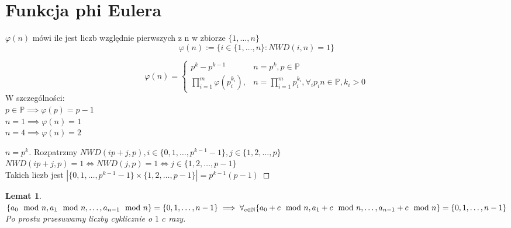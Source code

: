 \documentclass{article}
\theoremstyle{break}
\newtheorem{lemma}{Lemat}
\newtheorem{proof}{Dowód}
\begin{document}
\section{Funkcja phi Eulera}
$\varphi(n)$ mówi ile jest liczb względnie pierwszych z n w zbiorze $\{1, \dots, n\}$
\begin{displaymath}
	\varphi(n) := \{ i \in \{1, \dots, n \} : NWD(i, n) = 1 \}
\end{displaymath}

\begin{displaymath}
    \varphi(n) = \begin{cases}
        p^{k} - p^{k-1} & n = p^k, p \in \mathbb{P}\\
        \prod_{i = 1}^{m} \varphi(p_i^{k_i}), & n = \prod_{i=1}^m p_i^{k_i}, \forall_i p_i n\in \mathbb{P}, k_i > 0
        \end{cases}
\end{displaymath}
W szczególności: \\
$p \in \mathbb{P} \implies \varphi(p) = p-1$ \\
$n = 1 \implies \varphi(n) = 1$\\
$n = 4 \implies \varphi(n) = 2$

\begin{proof}[$ n = p^k$]
Rozpatrzmy $NWD(ip + j, p), i \in \{0, 1, \dots, p^{k-1} - 1\}, j \in \{1, 2, \dots, p \}$ \\
$NWD(ip + j, p) = 1 \iff NWD(j, p) = 1 \iff j \in \{1, 2, \dots, p - 1\}$ \\
Takich liczb jest $|\{0, 1, \dots, p^{k-1} - 1\}\times\{1, 2, \dots, p-1\}| = p^{k-1}(p-1)$

\end{proof}

\begin{lemma}
$\{ a_0 \mod{n}, a_1 \mod{n}, \dots, a_{n-1} \mod{n} \} = \{ 0, 1, \dots, n-1 \} \\
\implies \forall_{c \in \mathbb{N}}\{ a_0 + c \mod{n}, a_1 + c \mod{n}, \dots, a_{n-1} + c \mod{n} \} = \{ 0, 1, \dots, n-1 \} $
Po prostu przesuwamy liczby cyklicznie o $1$ $c$ razy.
\end{lemma}
\end{document}
